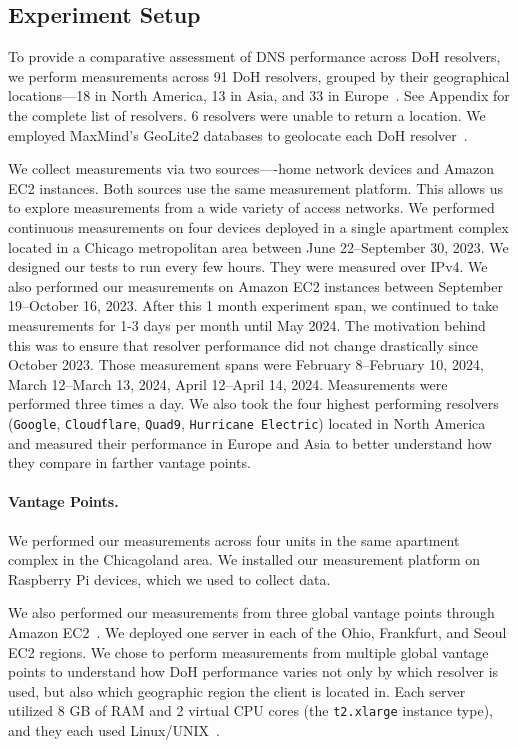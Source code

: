\subsection{Experiment Setup}
To provide a comparative assessment of DNS
performance across DoH resolvers, we perform measurements across 91 DoH
resolvers, grouped by their geographical locations—18 in North America, 13 in
Asia, and 33 in Europe~\cite{dnscrypt}. See Appendix for the complete list of resolvers. 6 resolvers were unable to return a location. 
We employed MaxMind's GeoLite2 databases to geolocate each DoH resolver~\cite{maxmind}.

We collect measurements via two sources—-home network devices and Amazon EC2 instances. 
Both sources use the same measurement platform. This allows us to explore measurements from a wide variety
of access networks. We performed continuous measurements on four devices deployed in a single apartment complex located in a 
Chicago metropolitan area between June 22--September 30, 2023. We designed our tests to run every few hours. They were measured over IPv4. We also performed our measurements on Amazon EC2 instances between September 19--October 16, 2023. 
After this 1 month experiment span, we continued to take measurements for 1-3 days per month until May 2024. 
The motivation behind this was to ensure that resolver performance did not change drastically since October 2023. 
Those measurement spans were February 8--February 10, 2024, 
March 12--March 13, 2024, April 12--April 14, 2024. Measurements were performed three times a day. 
We also took the four highest performing resolvers (\texttt{Google}, \texttt{Cloudflare}, \texttt{Quad9},
\texttt{Hurricane Electric}) located in North America and measured their
performance in Europe and Asia to better understand how they compare in
farther vantage points. 

\paragraph{Vantage Points.} 
We performed our measurements across four units in the same apartment complex in the Chicagoland area. 
We installed our measurement platform on Raspberry Pi devices, which we used to 
collect data. 

We also performed our measurements from three global
vantage points through Amazon EC2~\cite{amazon_ec2}.  We deployed one server
in each of the Ohio, Frankfurt, and Seoul EC2 regions.  We chose to perform
measurements from multiple global vantage points to understand how DoH
performance varies not only by which resolver is used, but also which
geographic region the client is located in.  Each server utilized 8 GB of RAM
and 2 virtual CPU cores (the \texttt{t2.xlarge} instance type), and they each
used Linux/UNIX~\cite{amazon_ec2_instance_types}.

